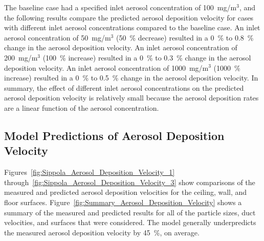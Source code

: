 The baseline case had a specified inlet aerosol concentration of 100~mg/m$^3$, and the following results compare the predicted aerosol deposition velocity for cases with different inlet aerosol concentrations compared to the baseline case. An inlet aerosol concentration of 50~mg/m$^3$ (50~\% decrease) resulted in a 0~\% to 0.8~\% change in the aerosol deposition velocity. An inlet aerosol concentration of 200~mg/m$^3$ (100~\% increase) resulted in a 0~\% to 0.3~\% change in the aerosol deposition velocity. An inlet aerosol concentration of 1000~mg/m$^3$ (1000~\% increase) resulted in a 0~\% to 0.5~\% change in the aerosol deposition velocity. In summary, the effect of different inlet aerosol concentrations on the predicted aerosol deposition velocity is relatively small because the aerosol deposition rates are a linear function of the aerosol concentration.

\subsection{Model Predictions of Aerosol Deposition Velocity}

Figures~\ref{fig:Sippola_Aerosol_Deposition_Velocity_1} through~\ref{fig:Sippola_Aerosol_Deposition_Velocity_3} show comparisons of the measured and predicted aerosol deposition velocities for the ceiling, wall, and floor surfaces. Figure~\ref{fig:Summary_Aerosol_Deposition_Velocity} shows a summary of the measured and predicted results for all of the particle sizes, duct velocities, and surfaces that were considered. The model generally underpredicts the measured aerosol deposition velocity by 45~\%, on average.

